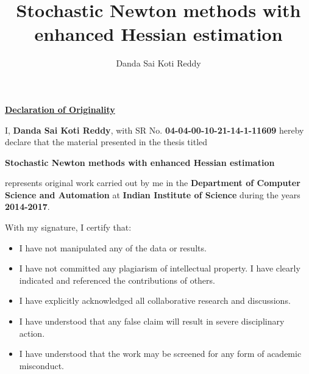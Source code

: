 \documentclass[oneside,12pt]{./thesisStyle/IIScthesisPSnPDF}
\begin{document}
\title{Stochastic Newton methods with enhanced Hessian estimation}	%

\submitdate{\monthyeardate\today} 
\mscengg
\author{Danda Sai Koti Reddy}



\maketitle


 \begin{center}
 \LARGE{\underline{\textbf{Declaration of Originality}}}
 \end{center}
 \noindent I, \textbf{Danda Sai Koti Reddy}, with SR No. \textbf{04-04-00-10-21-14-1-11609} hereby declare that
 the material presented in the thesis titled
 
 \begin{center}
 \textbf{Stochastic Newton methods with enhanced Hessian estimation}
 \end{center}
 
 \noindent represents original work carried out by me in the \textbf{Department
 of Computer Science and Automation} at \textbf{Indian Institute of
 Science} during the years \textbf{2014-2017}.
 
 \noindent With my signature, I certify that:
 \begin{itemize}
 	\item I have not manipulated any of the data or results.
 	\item I have not committed any plagiarism of intellectual
 	property.
 	I have clearly indicated and referenced the contributions of
 	others.
 	\item I have explicitly acknowledged all collaborative research
 	and discussions.
 	\item I have understood that any false claim will result in severe
 	disciplinary action.
 	\item I have understood that the work may be screened for any form
 	of academic misconduct.
 \end{itemize}
 
 \vspace{20mm}
 
\end{document}
